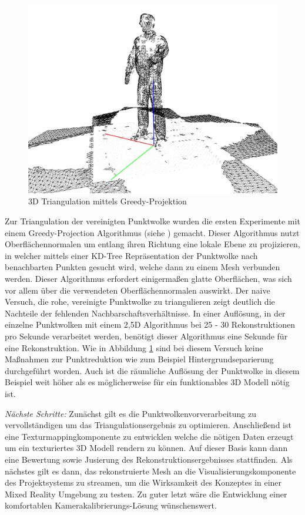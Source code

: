 \begin{figure}[H]
	\centering
	\includegraphics[width=.5\textwidth]{figs/meshed}
	\caption{3D Triangulation mittels Greedy-Projektion}
	\label{fig:meshed}
\end{figure}


Zur Triangulation der vereinigten Punktwolke wurden die ersten Experimente mit 
einem Greedy-Projection Algorithmus (siehe \cite{Marton09ICRA}) gemacht. Dieser 
Algorithmus nutzt Oberflächennormalen um entlang ihren Richtung eine lokale 
Ebene zu projizieren, in welcher mittels einer KD-Tree Repräsentation der Punktwolke 
nach benachbarten Punkten gesucht wird, welche dann zu einem Mesh verbunden 
werden. Dieser Algorithmus erfordert einigermaßen glatte Oberflächen, was sich 
vor allem über die verwendeten Oberflächennormalen auswirkt. Der naive Versuch, die 
rohe, vereinigte Punktwolke zu triangulieren zeigt deutlich die Nachteile der 
fehlenden Nachbarschaftsverhältnisse. In einer Auflösung, in der einzelne 
Punktwolken mit einem 2,5D Algorithmus bei 25 - 30 Rekonstruktionen pro Sekunde 
verarbeitet werden, benötigt dieser Algorithmus eine Sekunde für eine 
Rekonstruktion. Wie in Abbildung \ref{fig:meshed} sind bei diesem Versuch keine 
Maßnahmen zur Punktreduktion wie zum Beispiel Hintergrundseparierung 
durchgeführt worden. Auch ist die räumliche Auflösung der Punktwolke in diesem 
Beispiel weit höher als es möglicherweise für ein funktionables 3D Modell nötig 
ist.


{\em Nächste Schritte: } Zunächst gilt es die Punktwolkenvorverarbeitung zu 
vervollständigen um das Triangulationsergebnis zu optimieren. Anschließend ist 
eine Texturmappingkomponente zu entwicklen welche die nötigen Daten erzeugt um 
ein texturiertes 3D Modell rendern zu können. Auf dieser Basis kann dann eine 
Bewertung sowie Jusierung des Rekonstruktionsergebnisses stattfinden. Als 
nächstes gilt es dann, das rekonstruierte Mesh an die Visualisierungskomponente 
des Projektsystems zu streamen, um die Wirksamkeit des Konzeptes in einer Mixed 
Reality Umgebung zu testen. Zu guter letzt wäre die Entwicklung einer komfortablen 
Kamerakalibrierungs-Lösung wünschenswert.


